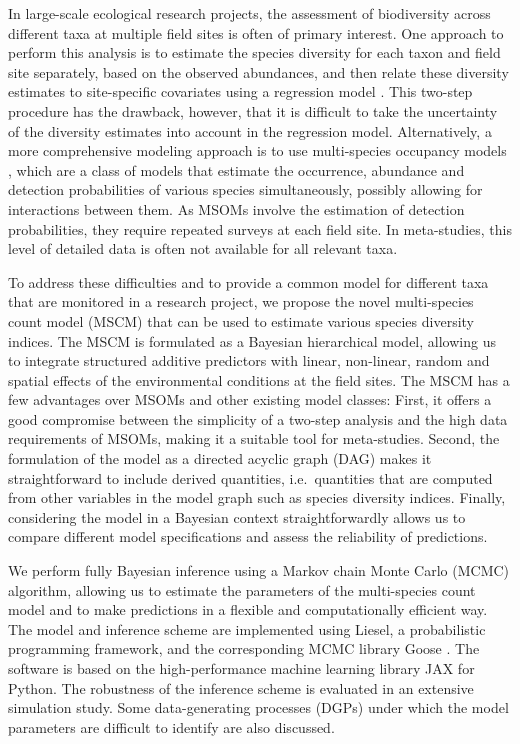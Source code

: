 \documentclass{article}
\begin{document}
In large-scale ecological research projects, the assessment of biodiversity across different taxa at multiple field sites is often of primary interest. One approach to perform this analysis is to estimate the species diversity for each taxon and field site separately, based on the observed abundances, and then relate these diversity estimates to site-specific covariates using a regression model \citep{glatthornSpecies2023}. This two-step procedure has the drawback, however, that it is difficult to take the uncertainty of the diversity estimates into account in the regression model. Alternatively, a more comprehensive modeling approach is to use multi-species occupancy models \citep[MSOMs,][]{mackenzieInvestigating2004, dorazioEstimating2005}, which are a class of models that estimate the occurrence, abundance and detection probabilities of various species simultaneously, possibly allowing for interactions between them. As MSOMs involve the estimation of detection probabilities, they require repeated surveys at each field site. In meta-studies, this level of detailed data is often not available for all relevant taxa.

To address these difficulties and to provide a common model for different taxa that are monitored in a research project, we propose the novel multi-species count model (MSCM) that can be used to estimate various species diversity indices. The MSCM is formulated as a Bayesian hierarchical model, allowing us to integrate structured additive predictors with linear, non-linear, random and spatial effects of the environmental conditions at the field sites. The MSCM has a few advantages over MSOMs and other existing model classes: First, it offers a good compromise between the simplicity of a two-step analysis and the high data requirements of MSOMs, making it a suitable tool for meta-studies. Second, the formulation of the model as a directed acyclic graph (DAG) makes it straightforward to include derived quantities, i.e.~quantities that are computed from other variables in the model graph such as species diversity indices. Finally, considering the model in a Bayesian context straightforwardly allows us to compare different model specifications and assess the reliability of predictions.

We perform fully Bayesian inference using a Markov chain Monte Carlo (MCMC) algorithm, allowing us to estimate the parameters of the multi-species count model and to make predictions in a flexible and computationally efficient way. The model and inference scheme are implemented using Liesel, a probabilistic programming framework, and the corresponding MCMC library Goose \citep{rieblLiesel2022}. The software is based on the high-performance machine learning library JAX \citep{bradburyJAX2023} for Python. The robustness of the inference scheme is evaluated in an extensive simulation study. Some data-generating processes (DGPs) under which the model parameters are difficult to identify are also discussed.
\end{document}
